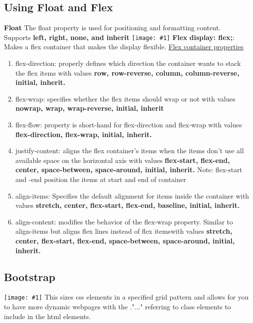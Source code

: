 \documentclass{article}
\def\image#1#2{{\texttt{[image: \#1]}}}
\def\enum#1{\begin{enumerate}#1\end{enumerate}}
\begin{document}
\subsection{Using Float and Flex}
\textbf{Float}\newline
The float property is used for positioning and formatting content. Supports \textbf{left, right, none, and inherit}\newline
\image{float.png}{0.25}\newline
\textbf{Flex}\newline
\textbf{display: flex;}: Makes a flex container that makes the display flexible.\newline
\ul{Flex container properties}
\enum{
\item{flex-direction: properly defines which direction the container wants to stack the flex items with values \textbf{row, row-reverse, column, column-reverse, initial, inherit.}}
\item{flex-wrap: specifies whether the flex items should wrap or not with values \textbf{nowrap, wrap, wrap-reverse, initial, inherit}}
\item{flex-flow: property is short-hand for flex-direction and flex-wrap with values \textbf{flex-direction, flex-wrap, initial, inherit.}}
\item{justify-content: aligns the flex container's items when the items don't use all available space on the horizontal axis with values \textbf{flex-start, flex-end, center, space-between, space-around, initial, inherit.} Note: flex-start and -end position the items at start and end of container}
\item{align-items: Specifies the default alignment for items inside the container with values \textbf{stretch, center, flex-start, flex-end, baseline, initial, inherit.}}
\item{align-content: modifies the behavior of the flex-wrap property. Similar to align-items but aligns flex lines instead of flex itemswith values \textbf{stretch, center, flex-start, flex-end, space-between, space-around, initial, inherit.}}
}

\subsection{Bootstrap}
\image{bootstrap.png}{0.35}\newline \newline
This sizes css elements in a specified grid pattern and allows for you to have more dynamic webpages with the ."..." referring to class elements to include in the html elements.
\end{document}
